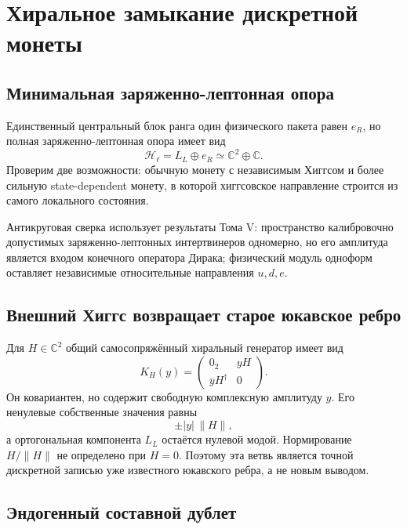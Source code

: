 \chapter{Хиральное замыкание дискретной монеты}
\label{ch:v6-spectral-transition-discrete-chiral-coin-closure-gate}

\section{Минимальная заряженно-лептонная опора}

Единственный центральный блок ранга один физического пакета равен $e_R$,
но полная заряженно-лептонная опора имеет вид
\begin{equation}
 \mathcal H_{\ell}=L_L\oplus e_R\simeq\mathbb C^2\oplus\mathbb C.
\end{equation}
Проверим две возможности: обычную монету с независимым Хиггсом и более
сильную state-dependent монету, в которой хиггсовское направление строится
из самого локального состояния.

Антикруговая сверка использует результаты Тома V: пространство
калибровочно допустимых заряженно-лептонных интертвинеров одномерно, но его
амплитуда является входом конечного оператора Дирака; физический модуль
одноформ оставляет независимые относительные направления $u,d,e$.

\section{Внешний Хиггс возвращает старое юкавское ребро}

Для $H\in\mathbb C^2$ общий самосопряжённый хиральный генератор имеет вид
\begin{equation}
 K_H(y)=
 \begin{pmatrix}
  0_{2} & yH\\
  \overline y H^\dagger & 0
 \end{pmatrix}.
 \label{eq:v6-discrete-external-higgs-coin}
\end{equation}
Он ковариантен, но содержит свободную комплексную амплитуду $y$. Его
ненулевые собственные значения равны
\begin{equation}
 \pm |y|\,\|H\|,
\end{equation}
а ортогональная компонента $L_L$ остаётся нулевой модой. Нормирование
$H/\|H\|$ не определено при $H=0$. Поэтому эта ветвь является точной
дискретной записью уже известного юкавского ребра, а не новым выводом.

\section{Эндогенный составной дублет}

